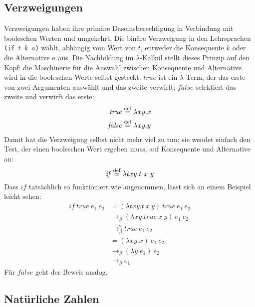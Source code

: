 \subsection{Verzweigungen}
\label{sec:booleans}
%
Verzweigungen haben ihre primäre Daseinsberechtigung in Verbindung mit
booleschen Werten und umgekehrt.
Die binäre Verzweigung in den Lehrsprachen
\texttt{(if \(t\) \(k\) \(a\))}
wählt, abhängig vom Wert von $t$,
entweder die Konsequente $k$ oder die Alternative $a$ aus.  Die Nachbildung im
$\lambda$-Kalkül stellt dieses Prinzip auf den Kopf: die Maschinerie
für die Auswahl zwischen Konsequente und Alternative wird in die
booleschen Werte selbst gesteckt.  $\mathit{true}$ ist ein
$\lambda$-Term, der das erste von zwei Argumenten auswählt und das
zweite verwirft; $\mathit{false}$ selektiert das zweite und verwirft
das erste:
%
\begin{align*}
  \mathit{true} & \stackrel{\rm def}{=}{} \lambda x y.x \\
  \mathit{false} & \stackrel{\rm def}{=}{} \lambda x y.y
\end{align*}
%
Damit hat die Verzweigung selbst nicht mehr viel zu tun; sie wendet
einfach den Test, der einen booleschen Wert ergeben muss, auf
Konsequente und Alternative an:
%
\begin{displaymath}
  \mathit{if} \stackrel{\rm def}{=}{} \lambda t x y.t~x~y
\end{displaymath}
%
Dass $\mathit{if}$ tatsächlich so funktioniert wie angenommen, lässt
sich an einem Beispiel leicht sehen:
%
\begin{displaymath}
  \begin{split}
    \mathit{if}~\mathit{true}~e_1~e_2 & =
    (\lambda t x y.t~x~y)~\mathit{true}~e_1~e_2
    \\
    & \rightarrow_\beta (\lambda x y.\mathit{true}~x~y)~e_1~e_2\\
    & \rightarrow_\beta^2 \mathit{true}~e_1~e_2\\
    & = (\lambda x y.x)~e_1~e_2\\
    & \rightarrow_\beta (\lambda y.e_1)~e_2\\
    & \rightarrow_\beta e_1  \end{split}
\end{displaymath}
%
Für $\mathit{false}$ geht der Beweis analog.

\subsection{Natürliche Zahlen}

